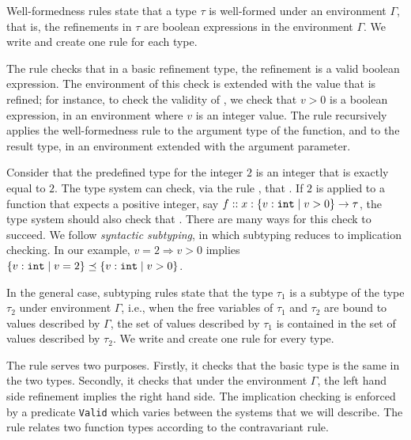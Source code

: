 Well-formedness rules  
state that a type $\tau$ is well-formed under an environment
$\Gamma$, that is, the refinements in $\tau$ are boolean 
expressions in the environment $\Gamma$.
%
We write \isWellFormed{\Gamma}{\tau} and create one rule for each type.

The rule \wtBase checks that in a basic refinement type,  
the refinement is a valid boolean expression.
The environment of this check is extended with the value that is refined;
for instance, to check the validity of , 
we check that $v > 0$ is a boolean expression, in an 
environment where $v$ is an integer value.
%
The rule \wtFun recursively applies the well-formedness rule to
the argument type of the function, and to the result type, 
in an environment extended with the argument parameter.

Consider that the predefined type for the integer $2$
is an integer that is exactly equal to $2$.
The type system can check, via the rule \tconst , that 
.
If $2$ is applied to a function that expects a
positive integer, say $f::{x:\left\lbrace v : \texttt{int}\mid v>0\right\rbrace} \rightarrow \tau$,
the type system should also check that 
.
%
There are many ways for this check to succeed.
We follow \textit{syntactic subtyping},
in which subtyping reduces to implication checking.
In our example, $v = 2 \Rightarrow v > 0 $ implies 
$\left\lbrace v : \texttt{int}\mid v=2\right\rbrace \preceq \left\lbrace v : \texttt{int}\mid v>0\right\rbrace$.


In the general case, subtyping rules
state that the type $\tau_1$ is a subtype of the type
$\tau_2$ under environment $\Gamma$, i.e., when the free variables
of $\tau_1$ and $\tau_2$
are bound to values described by $\Gamma$, the set of values described
by $\tau_1$ is contained in the set of values described by $\tau_2$. 
We write  and create one rule for every type.

The rule \tsubBase serves two purposes.
Firstly,
it checks that the basic type is the same in the two types.
Secondly, it checks that under the environment $\Gamma$, 
the left hand side refinement implies the right hand side.
The implication checking is enforced by a predicate \texttt{Valid} 
which varies between the systems that we will describe.
%
The rule \tsubFun relates two function types according to the contravariant rule.


